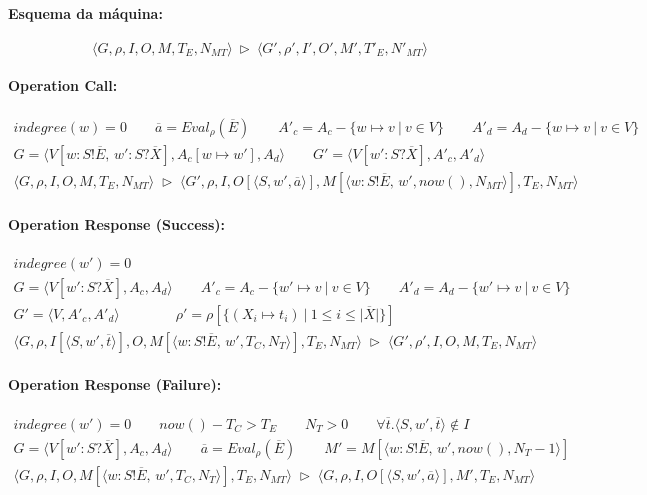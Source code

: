 \documentclass{llncs}
\newcommand{\tuple}[1]{\langle #1 \rangle}
\newcommand{\setof}[1]{\{ #1 \} }
\newcommand{\eval}[2]{\mathit{Eval}_{#1}(#2)}
\def\tr{\rhd}    %
\newcommand{\pfrule}[2]{\begin{array}{c} #1 \\ \hline #2 \end{array}}
\begin{document}
\paragraph{Esquema da máquina:}

$$\tuple{G, \rho, I, O, M, T_E, N_{MT}} \ \tr\ \tuple{G', \rho', I', O', M', T'_E, N'_{MT}}$$

\paragraph{Operation Call:}

$$
\pfrule{
\mathit{indegree}(w) = 0 \qquad 
\overline{a} = \eval{\rho}{\overline{E}} \qquad
A'_c = A_c - \setof{w\mapsto v \ | \ v \in V} \qquad
A'_d = A_d - \setof{w\mapsto v \ | \ v \in V} \\[1mm]
G = \tuple{V[w:S!\overline{E}, \, w' : S?\overline{X}], A_c[w \mapsto w'], A_d} \qquad
G' = \tuple{V[w' : S?\overline{X}], A'_c, A'_d}
}{
\tuple{G,\rho, I, O, M, T_E, N_{MT}}
\; \tr \;
\tuple{G',\rho, I, O[\tuple{S, w', \overline{a}}], M[\tuple{w:S!\overline{E}, \, w', \mathit{now()}, N_{MT}}], T_E, N_{MT}}
}
$$

\paragraph{Operation Response (Success):}
$$
\pfrule{
\mathit{indegree}(w') = 0 \\[1mm]
G = \tuple{V[w' : S?\overline{X}], A_c, A_d} \qquad
A'_c = A_c - \setof{w'\mapsto v \ | \ v \in V} \qquad
A'_d = A_d - \setof{w'\mapsto v \ | \ v \in V} \\[1mm]
G' = \tuple{V, A'_c, A'_d} \qquad \qquad
\rho' = \rho[\setof{(X_i\mapsto t_i) \ | \ 1 \leq i \leq |\overline{X}|}]
}{
\tuple{G,\rho, I[\tuple{S, w', \overline{t}}], O, M[\tuple{w:S!\overline{E}, \, w', T_C, N_{T}}], T_E, N_{MT}}
\; \tr \;
\tuple{G',\rho', I, O, M, T_E, N_{MT}}
}
$$

\paragraph{Operation Response (Failure):}
$$
\pfrule{
\mathit{indegree}(w') = 0 \qquad
\mathit{now()} - T_C > T_E \qquad
N_T > 0 \qquad
\forall \overline{t}. \tuple{S, w', \overline{t}} \not\in I \\[1mm]
G = \tuple{V[w' : S?\overline{X}], A_c, A_d} \qquad
\overline{a} = \eval{\rho}{\overline{E}} \qquad
M'= M[\tuple{w:S!\overline{E}, \, w', \mathit{now()}, N_{T}-1}]
}{
\tuple{G,\rho, I, O, M[\tuple{w:S!\overline{E}, \, w', T_C, N_{T}}], T_E, N_{MT}}
\; \tr \;
\tuple{G,\rho, I, O[\tuple{S, w', \overline{a}}], M', T_E, N_{MT}}
}
$$
\end{document}
